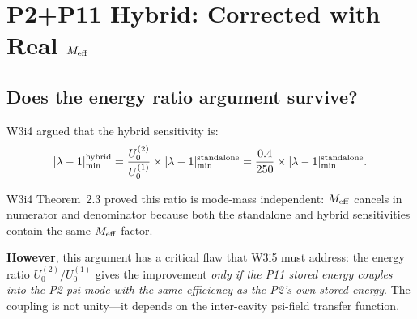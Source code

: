 \documentclass[11pt,twocolumn]{article}
\newcommand{\lam}{\lambda}
\newcommand{\Meff}{M_{\rm eff}}
\theoremstyle{definition}
\theoremstyle{remark}
\begin{document}
\section{P2+P11 Hybrid: Corrected with Real $\Meff$}
\label{sec:hybrid_corrected}

\subsection{Does the energy ratio argument survive?}
\label{sec:energy_ratio}

W3i4 argued that the hybrid sensitivity is:
\begin{equation}
|\lam-1|_{\rm min}^{\rm hybrid}
= \frac{U_0^{(2)}}{U_0^{(1)}} \times |\lam-1|_{\rm min}^{\rm standalone}
= \frac{0.4}{250}\times |\lam-1|_{\rm min}^{\rm standalone}.
\label{eq:hybrid_ratio_W3i4}
\end{equation}

W3i4 Theorem~2.3 proved this ratio is mode-mass independent: $\Meff$
cancels in numerator and denominator because both the standalone and
hybrid sensitivities contain the same $\Meff$ factor.

\textbf{However}, this argument has a critical flaw that W3i5 must
address: the energy ratio $U_0^{(2)}/U_0^{(1)}$ gives the improvement
\emph{only if the P11 stored energy couples into the P2 psi mode with
the same efficiency as the P2's own stored energy}. The coupling is
not unity---it depends on the inter-cavity psi-field transfer function.
\end{document}
